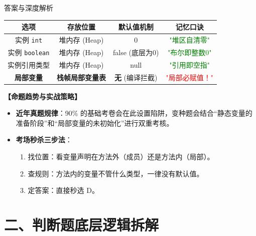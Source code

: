 \documentclass[12pt, a4paper]{ctexart}
\begin{document}
\begin{enumerate}[label=\textbf{\arabic*.}]
\begin{bluebox}{答案与深度解析}
\begin{enumerate}[leftmargin=*, nosep]
		      \end{enumerate}
\begin{tabular}{|c|c|c|c|}
				            \hline
				            \textbf{选项}         & \textbf{存放位置}    & \textbf{默认值机制}    & \textbf{记忆口诀}               \\
				            \hline
				            实例 \texttt{int}     & 堆内存 (Heap)       & 0                 & \textcolor{green}{"堆区自清零"}  \\
				            \hline
				            实例 \texttt{boolean} & 堆内存 (Heap)       & false (底层为0)      & \textcolor{green}{"布尔即整数0"} \\
				            \hline
				            实例引用类型              & 堆内存 (Heap)       & null              & \textcolor{green}{"引用即空指"}  \\
				            \hline
				            \textbf{局部变量}       & \textbf{栈帧局部变量表} & \textbf{无} (编译拦截) & \textcolor{red}{"局部必赋值！"}   \\
				            \hline
			            \end{tabular}
				\newline
		      \textbf{【命题趋势与实战策略】}
		      \begin{itemize}[leftmargin=*, nosep]
			      \item \textbf{近年真题规律}：90\% 的基础考卷会在此设置陷阱，变种题会结合“静态变量的准备阶段”和“局部变量的未初始化”进行双重考核。
			      \item \textbf{考场秒杀三步法}：
			            \begin{enumerate}
				            \item 找位置：看变量声明在方法外（成员）还是方法内（局部）。
				            \item 查规则：方法内的变量不管什么类型，一律没有默认值。
				            \item 定答案：直接秒选 D。
			            \end{enumerate}
		      \end{itemize}
	      \end{bluebox}

\end{enumerate}

\newpage
\section{二、判断题底层逻辑拆解}
\end{document}
